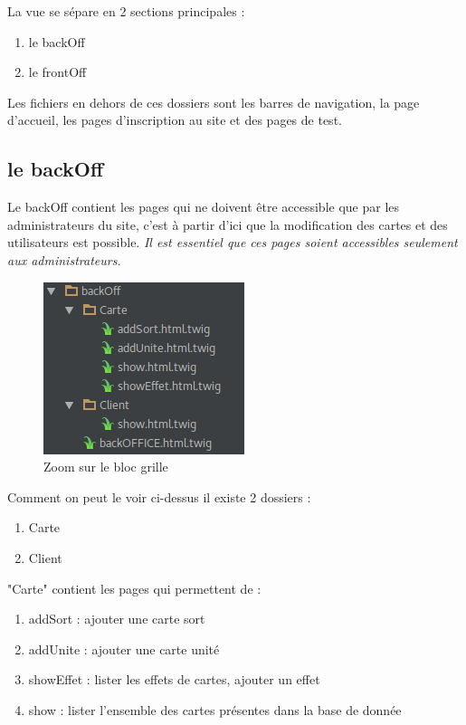 \documentclass[a4paper, titlepage]{livret}
\begin{document}
	La vue se sépare en 2 sections principales :
	\begin{enumerate}
		\item le backOff
		\item le frontOff
	\end{enumerate}

	Les fichiers en dehors de ces dossiers sont les barres de navigation, la page d'accueil, les pages d'inscription au site et des pages de test.
    
	\subsection{le backOff}
        Le backOff contient les pages qui ne doivent être accessible que par les administrateurs du site, c'est à partir d'ici que la modification des cartes et des utilisateurs est possible. \textit{Il est essentiel que ces pages soient accessibles seulement aux administrateurs. }
    \begin{figure}[th]
      \begin{center}
        \includegraphics[scale=0.4]{Assets/backOff.png}
        \caption{Zoom sur le bloc grille}
        \label{fig4}
      \end{center}
    \end{figure}

	Comment on peut le voir ci-dessus il existe 2 dossiers :
	\begin{enumerate}
		\item Carte
		\item Client
	\end{enumerate}

	"Carte" contient les pages qui permettent de :
	\begin{enumerate}
		\item addSort : ajouter une carte sort
		\item addUnite : ajouter une carte unité
		\item showEffet : lister les effets de cartes, ajouter un effet
		\item show : lister l'ensemble des cartes présentes dans la base de donnée
	\end{enumerate}
\end{document}
